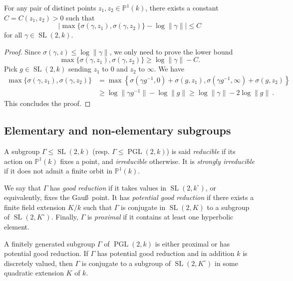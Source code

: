 \documentclass[AHL,Unicode,longabstracts]{cedram}
\DeclareMathOperator{\SL}{SL}
\DeclareMathOperator{\PGL}{PGL}
\newcommand{\PP}{\mathbb{P}}
\newcommand{\SLk}{\SL(2,k)}
\newcommand{\PGLk}{\PGL(2, k)}
\begin{document}
\begin{lemm}\label{lem:two points}
For any pair of distinct points $z_1, z_2 \in \PP^1(k)$, there exists a constant $C = C(z_1, z_2)>0$ such that
\[
\left| \max \{ \sigma(\gamma, z_1), \sigma(\gamma, z_2)\} - \log \| \gamma \| \right|
\le C
\]
for all $\gamma\in \SL(2,k)$.
\end{lemm}
\begin{proof}
Since $ \sigma(\gamma, z) \le \log \| \gamma\|$, we only need to prove the lower bound
\[
\max \{ \sigma(\gamma, z_1), \sigma(\gamma, z_2)\} \ge \log \| \gamma \| -C.
\]
Pick $g\in \SLk$ sending $z_1$ to $0$ and $z_2$ to $\infty$. We have
\begin{align*}
\max \{ \sigma(\gamma, z_1), \sigma(\gamma, z_2)\} &=
\max \left\{ \sigma(\gamma g^{-1}, 0) + \sigma (g,z_1), \sigma(\gamma g^{-1}, \infty) + \sigma (g,z_2)\right\}\\
&\ge \log \| \gamma g^{-1}\| -\log \| g \| \ge \log \| \gamma\| - 2\log \| g \|~.
\end{align*}
This concludes the proof.
\end{proof}



\subsection{Elementary and non-elementary subgroups} \label{subs:elementary}

A subgroup $\Gamma\leq \SLk$ (resp. $\Gamma \leq \PGLk$) is said \emph{reducible} if its action on $\PP^1(k)$ fixes a point, and \emph{irreducible} otherwise. It is \emph{strongly irreducible} if it does not admit a finite orbit in $\PP^1(k)$.

We say that $\Gamma$ has \emph{good reduction} if it takes values in $\SL(2,k^\circ)$, or equivalently, fixes the Gau\ss~point. It has \emph{potential good reduction} if there exists a finite field extension $K/k$ such that $\Gamma$ is conjugate in $\SL(2,K)$ to a subgroup of $\SL(2,K^\circ)$. Finally, $\Gamma$ is \emph{proximal } if it contains at least one hyperbolic element.

\begin{prop}\label{prop:fixed point}
A finitely generated subgroup $\Gamma$ of $\PGLk$ is either proximal or has potential good reduction. If $\Gamma$ has potential good reduction and in addition $k$ is discretely valued, then $\Gamma$ is conjugate to a subgroup of $\SL(2,K^\circ)$ in some quadratic extension $K$ of $k$.
\end{prop}
\end{document}
